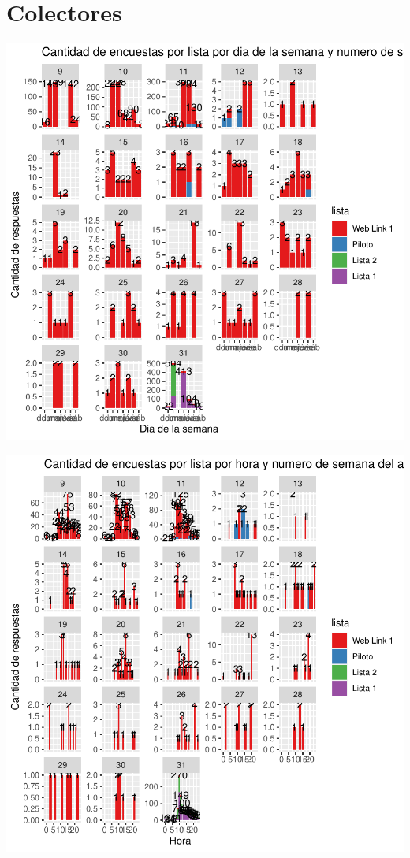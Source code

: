 \documentclass{article}
\begin{document}
\section{Colectores}

\includegraphics{seguimientov5-003}


\includegraphics{seguimientov5-004}
\end{document}

